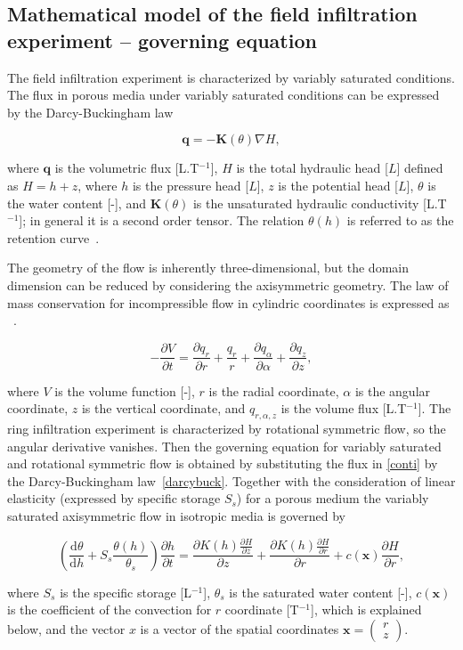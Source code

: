 \documentclass[review,times,3p,10pt]{elsarticle}
\newenvironment{lineq}
    {\begin{linenomath*}
    \begin{equation}
    }
    { 
    \end{equation} 
    \end{linenomath*}
    }
\newcommand{\dd}{\mathrm{d}}
\renewcommand{\vec}{\mathbf}
\begin{document}
\subsection{Mathematical model of the field infiltration experiment -- governing equation}%
\label{goveq}


The field infiltration experiment is characterized by variably saturated conditions. The flux in porous media under variably saturated conditions can be expressed by the Darcy-Buckingham law~\citep{buckingham} \begin{lineq}\label{darcybuck}\vec{q} = -\mathbf{K}(\theta) \nabla H,\end{lineq} where $\vec{q}$ is the volumetric flux [L.T$^{-1}$], $H$ is the total hydraulic head [$L$] defined as $H=h+z$, where $h$ is the pressure head [$L$], $z$ is the potential head [$L$], $\theta$ is the water content [-], and $\mathbf{K}(\theta)$ is the unsaturated hydraulic conductivity  [L.T$^{-1}$]; in general it is a  second order tensor. The relation $\theta(h)$ is referred to as the retention curve~\citep{vangenuchten}.

The geometry of the flow is inherently three-dimensional, but the domain dimension can be reduced by considering the axisymmetric geometry. The law of mass conservation  for incompressible flow in cylindric coordinates is expressed as ~\citep{bear1979}.
\begin{lineq}
\label{conti}
-\frac{\partial V}{\partial t} = \frac{\partial q_r}{\partial r} + \frac{q_r}{r} + \frac{\partial q_{\alpha}}{\partial \alpha} + \frac{\partial q_z}{\partial z} ,
\end{lineq}
where $V$ is the volume function [-],  $r$ is the radial coordinate, $\alpha$ is the angular coordinate,  $z$ is the vertical coordinate, and $q_{r, \alpha, z}$ is the  volume flux [L.T$^{-1}$]. The ring infiltration experiment is characterized by rotational symmetric flow, so the angular derivative vanishes. Then the governing equation for  variably saturated and rotational symmetric flow is obtained by substituting the flux in \eqref{conti} by the Darcy-Buckingham law~\eqref{darcybuck}. Together with the consideration of linear elasticity (expressed by specific storage $S_s$) for a porous medium the variably saturated axisymmetric flow in isotropic media is governed by
\begin{lineq}
\label{richaxi}
\left(\frac{\dd \theta}{\dd h} + S_s\frac{\theta(h)}{\theta_s} \right) \frac{\partial h}{\partial t}  =  \frac{\partial K(h) \frac{\partial H}{\partial z}}{\partial z} + \frac{\partial K(h) \frac{\partial H}{\partial r}}{\partial r} + c(\vec{x})\frac{\partial H}{\partial r},
\end{lineq}
where $S_s$ is the specific storage [L$^{-1}$], $\theta_s$ is the saturated water content [-],  $c(\vec{x})$ is the coefficient of the convection for $r$ coordinate [T$^{-1}$], which is explained below, and the vector $x$ is a vector of the spatial coordinates $\vec{x}=\left( \begin{smallmatrix} r \\ z \end{smallmatrix} \right)$.
\end{document}
